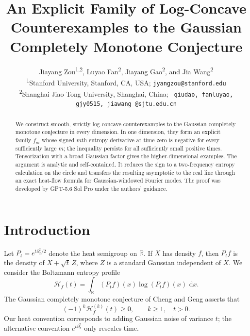 \documentclass[10pt,letterpaper,journal]{IEEEtran}
\title{An Explicit Family of Log-Concave Counterexamples to the Gaussian Completely Monotone Conjecture}
\author{Jiayang Zou\textsuperscript{1,2}, Luyao Fan\textsuperscript{2},
Jiayang Gao\textsuperscript{2}, and Jia Wang\textsuperscript{2}\\[0.5ex]
\small \textsuperscript{1}Stanford University, Stanford, CA, USA;
\texttt{jyangzou@stanford.edu}\\
\small \textsuperscript{2}Shanghai Jiao Tong University, Shanghai, China;
\texttt{\char123 qiudao, fanluyao, gjy0515, jiawang\char125 @sjtu.edu.cn}}
\newcommand{\R}{\mathbb{R}}
\newcommand{\cH}{\mathcal{H}}
\newcommand{\dd}{\,\mathrm{d}}
\theoremstyle{plain}
\theoremstyle{definition}
\begin{document}
\maketitle

\setlength{\abovedisplayskip}{4pt plus 2pt minus 1pt}
\setlength{\belowdisplayskip}{4pt plus 2pt minus 1pt}
\setlength{\abovedisplayshortskip}{1pt plus 1pt}
\setlength{\belowdisplayshortskip}{3pt plus 2pt minus 1pt}

\begin{abstract}
We construct smooth, strictly log-concave counterexamples to the Gaussian
completely monotone conjecture in every dimension. In one dimension, they form
an explicit family $f_m$ whose signed $m$th entropy derivative at time zero is
negative for every sufficiently large $m$; the inequality persists for all
sufficiently small positive times. Tensorization with a broad Gaussian factor
gives the higher-dimensional examples. The argument is analytic and
self-contained. It reduces the sign to a two-frequency entropy calculation on
the circle and transfers the resulting asymptotic to the real line through an
exact heat-flow formula for Gaussian-windowed Fourier modes. The proof was
developed by GPT-5.6 Sol Pro under the authors' guidance.
\end{abstract}


\section{Introduction}
\label{sec:introduction}

Let $P_t=e^{t\partial_x^2/2}$ denote the heat semigroup on $\R$.  If $X$
has density $f$, then $P_tf$ is the density of $X+\sqrt{t}\,Z$, where $Z$
is a standard Gaussian independent of $X$.  We consider the Boltzmann
entropy profile
\begin{equation}
 \cH_f(t)=\int_{\R}(P_tf)(x)\log(P_tf)(x)\,\dd x.
 \label{eq:entropy-profile}
\end{equation}
The Gaussian completely monotone conjecture of Cheng and Geng
\cite{ChengGeng2015} asserts that
\begin{equation}
 (-1)^k\cH_f^{(k)}(t)\ge0,
 \qquad k\ge1,\quad t>0.
 \label{eq:gcmc}
\end{equation}
Our heat convention corresponds to adding Gaussian noise of variance $t$;
the alternative convention $e^{t\partial_x^2}$ only rescales time.
\end{document}
